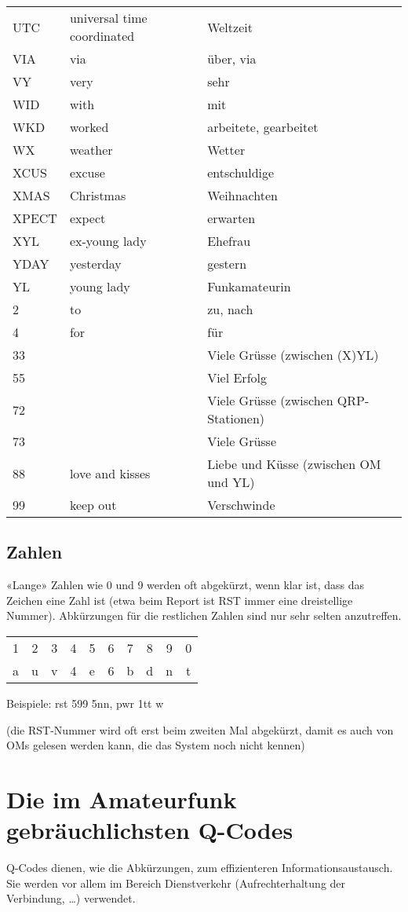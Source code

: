 \begin{tabular}{lll}
UTC & universal time coordinated & Weltzeit \\
VIA & via & über, via \\
VY & very & sehr \\
WID & with & mit \\
WKD & worked & arbeitete, gearbeitet \\
WX & weather & Wetter \\
XCUS & excuse & entschuldige \\
XMAS & Christmas & Weihnachten \\
XPECT & expect & erwarten \\
XYL & ex-young lady & Ehefrau \\
YDAY & yesterday & gestern \\
YL & young lady & Funkamateurin \\
2 & to & zu, nach \\
4 & for & für \\
33 &  & Viele Grüsse (zwischen (X)YL) \\
55 &  & Viel Erfolg \\
72 &  & Viele Grüsse (zwischen QRP-Stationen) \\
73 &  & Viele Grüsse \\
88 & love and kisses & Liebe und Küsse (zwischen OM und YL) \\
99 & keep out & Verschwinde
\end{tabular}

\subsection{Zahlen}
«Lange» Zahlen wie 0 und 9 werden oft abgekürzt, wenn klar ist, dass das Zeichen eine Zahl ist (etwa beim Report ist RST immer eine dreistellige Nummer). Abkürzungen für die restlichen Zahlen sind nur sehr selten anzutreffen.

\begin{tabular}{cccccccccc}
1 & 2 & 3 & 4 & 5 & 6 & 7 & 8 & 9 & 0 \\
a & u & v & 4 & e & 6 & b & d & n & t
\end{tabular}

Beispiele: rst 599 5nn, pwr 1tt w

(die RST-Nummer wird oft erst beim zweiten Mal abgekürzt, damit es auch von OMs gelesen werden kann, die das System noch nicht kennen)

\section{Die im Amateurfunk gebräuchlichsten Q-Codes}
Q-Codes dienen, wie die Abkürzungen, zum effizienteren Informationsaustausch. Sie werden vor allem im Bereich Dienstverkehr (Aufrechterhaltung der Verbindung, …) verwendet.

